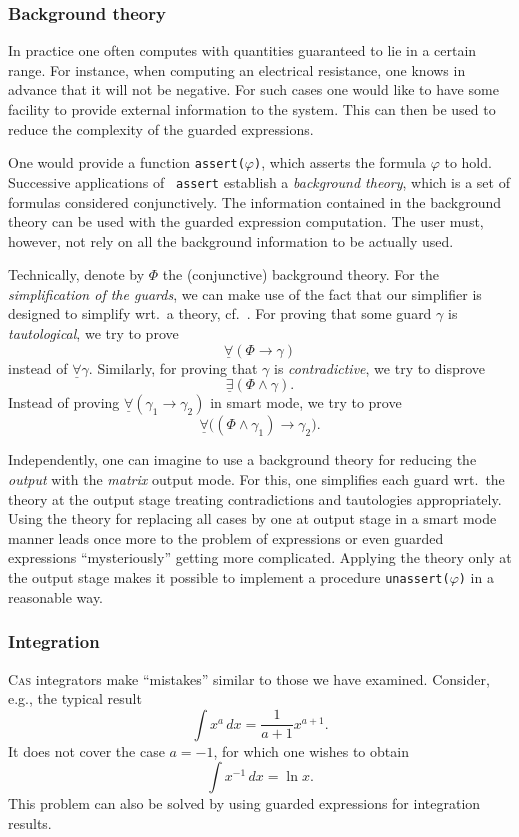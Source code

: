 \subsubsection{Background theory}\label{background}
In practice one often computes with quantities guaranteed to lie in a
certain range. For instance, when computing an electrical resistance,
one knows in advance that it will not be negative. For such cases one
would like to have some facility to provide external information to
the system. This can then be used to reduce the complexity of the
guarded expressions.

One would provide a function {\tt assert($\varphi$)}, which asserts
the formula {\tt $\varphi$} to hold. Successive applications of {\tt
assert} establish a {\em background theory}, which is a set of
formulas considered conjunctively. The information contained in the
background theory can be used with the guarded expression computation.
The user must, however, not rely on all the background information to
be actually used.

Technically, denote by $\Phi$ the (conjunctive) background theory. For
the {\em simplification of the guards}, we can make use of the fact
that our simplifier is designed to simplify wrt.~a theory,
cf.~\cite{DolzmannSturm:95}. For proving that some guard $\gamma$ is
{\em tautological}, we try to prove
$$\underline{\forall}(\Phi\longrightarrow\gamma)$$ instead of
$\underline{\forall}\gamma$. Similarly, for proving that $\gamma$ is
{\em contradictive}, we try to disprove
$$\underline{\exists}(\Phi\land\gamma).$$ Instead of proving
$\underline{\forall}(\gamma_1\longrightarrow\gamma_2)$ in smart mode, we try to
prove
$$\underline{\forall}\bigl((\Phi\land\gamma_1)\longrightarrow\gamma_2\bigr).$$

Independently, one can imagine to use a background theory for reducing
the {\em output} with the {\em matrix} output mode. For this, one
simplifies each guard wrt.~the theory at the output stage treating
contradictions and tautologies appropriately. Using the theory for
replacing all cases by one at output stage in a smart mode manner
leads once more to the problem of expressions or even guarded
expressions ``mysteriously'' getting more complicated. Applying the
theory only at the output stage makes it possible to implement a
procedure {\tt unassert($\varphi$)} in a reasonable way.
%
\subsubsection{Integration}\label{integration}
\textsc{Cas} integrators make ``mistakes'' similar to those we have
examined. Consider, e.g., the typical result
$$
\int x^a\,dx=\frac{1}{a+1}x^{a+1}.
$$
It does not cover the case $a=-1$, for which one wishes to obtain
$$
\int x^{-1}\,dx=\ln x.
$$
This problem can also be solved by using guarded expressions for
integration results.

